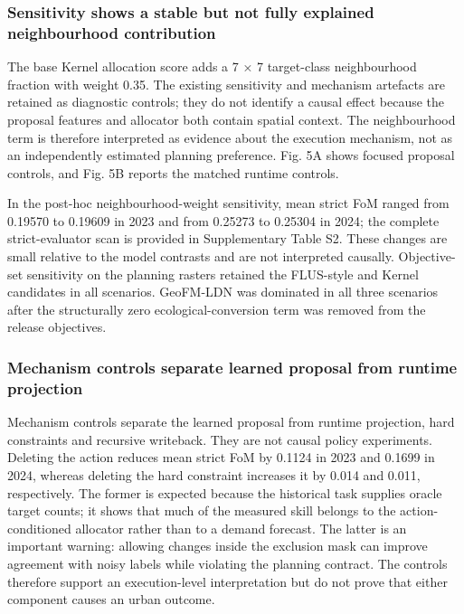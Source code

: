 \subsubsection{Sensitivity shows a stable but not fully explained
neighbourhood
contribution}\label{sensitivity-shows-a-stable-but-not-fully-explained-neighbourhood-contribution}

The base Kernel allocation score adds a 7 × 7 target-class neighbourhood
fraction with weight 0.35. The existing sensitivity and mechanism
artefacts are retained as diagnostic controls; they do not identify a
causal effect because the proposal features and allocator both contain
spatial context. The neighbourhood term is therefore interpreted as
evidence about the execution mechanism, not as an independently
estimated planning preference. Fig. 5A shows focused proposal controls,
and Fig. 5B reports the matched runtime controls.

In the post-hoc neighbourhood-weight sensitivity, mean strict FoM ranged
from 0.19570 to 0.19609 in 2023 and from 0.25273 to 0.25304 in 2024; the
complete strict-evaluator scan is provided in Supplementary Table S2.
These changes are small relative to the model contrasts and are not
interpreted causally. Objective-set sensitivity on the planning rasters
retained the FLUS-style and Kernel candidates in all scenarios.
GeoFM-LDN was dominated in all three scenarios after the structurally
zero ecological-conversion term was removed from the release objectives.

\subsubsection{Mechanism controls separate learned proposal from runtime
projection}\label{mechanism-controls-separate-learned-proposal-from-runtime-projection}

Mechanism controls separate the learned proposal from runtime
projection, hard constraints and recursive writeback. They are not
causal policy experiments. Deleting the action reduces mean strict FoM
by 0.1124 in 2023 and 0.1699 in 2024, whereas deleting the hard
constraint increases it by 0.014 and 0.011, respectively. The former is
expected because the historical task supplies oracle target counts; it
shows that much of the measured skill belongs to the action-conditioned
allocator rather than to a demand forecast. The latter is an important
warning: allowing changes inside the exclusion mask can improve
agreement with noisy labels while violating the planning contract. The
controls therefore support an execution-level interpretation but do not
prove that either component causes an urban outcome.

